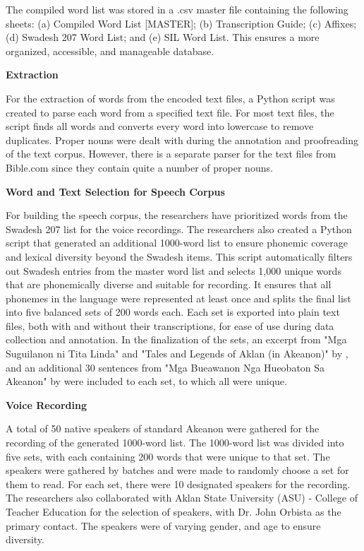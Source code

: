 The compiled word list was stored in a .csv master file containing the following sheets: (a) Compiled Word List [MASTER]; (b) Transcription Guide; (c) Affixes; (d) Swadesh 207 Word List; and (e) SIL Word List. This ensures a more organized, accessible, and manageable database.

\textbf{Extraction}

For the extraction of words from the encoded text files, a Python script was created to parse each word from a specified text file. For most text files, the script finds all words and converts every word into lowercase to remove duplicates. Proper nouns were dealt with during the annotation and proofreading of the text corpus. However, there is a separate parser for the text files from Bible.com since they contain quite a number of proper nouns.

\textbf{Word and Text Selection for Speech Corpus}

For building the speech corpus, the researchers have prioritized words from the Swadesh 207 list for the voice recordings. The researchers also created a Python script that generated an additional 1000-word list to ensure phonemic coverage and lexical diversity beyond the Swadesh items. This script automatically filters out Swadesh entries from the master word list and selects 1,000 unique words that are phonemically diverse and suitable for recording. It ensures that all phonemes in the language were represented at least once and splits the final list into five balanced sets of 200 words each. Each set is exported into plain text files, both with and without their transcriptions, for ease of use during data collection and annotation. In the finalization of the sets, an excerpt from "Mga Suguilanon ni Tita Linda" and "Tales and Legends of Aklan (in Akeanon)" by , and an additional 30 sentences from "Mga Bueawanon Nga Hueobaton Sa Akeanon" by  were included to each set, to which all were unique.

\textbf{Voice Recording}

A total of 50 native speakers of standard Akeanon were gathered for the recording of the generated 1000-word list. The 1000-word list was divided into five sets, with each containing 200 words that were unique to that set. The speakers were gathered by batches and were made to randomly choose a set for them to read. For each set, there were 10 designated speakers for the recording. The researchers also collaborated with Aklan State University (ASU) - College of Teacher Education for the selection of speakers, with Dr. John Orbista as the primary contact. The speakers were of varying gender, and age to ensure diversity.


